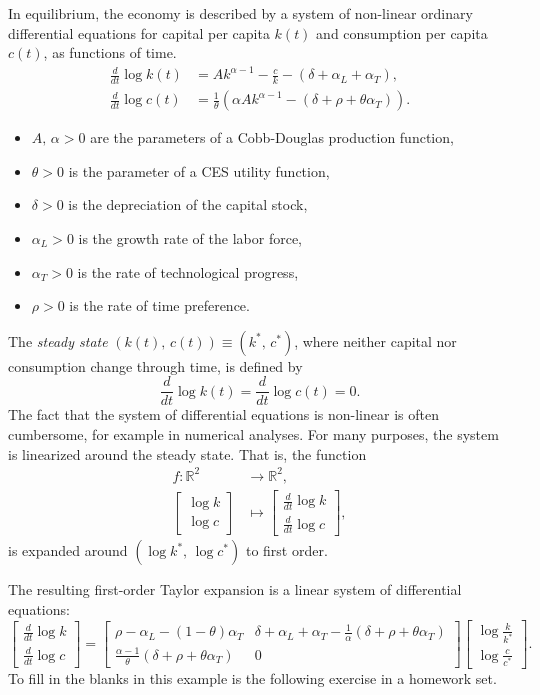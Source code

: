 \documentclass[graybox]{svmult}
\newcommand{\R}{\mathds{R}}
\begin{document}
In equilibrium, the economy is described by a system of non-linear ordinary differential equations for capital per capita $k(t)$ and consumption per capita $c(t)$, as functions of time.
\begin{align*}
\frac{d}{dt} \log k(t) &= A k^{\alpha-1} - \frac{c}{k} - (\delta + \alpha_L + \alpha_T),\\
\frac{d}{dt} \log c(t) &= \frac{1}{\theta} \left( \alpha A k^{\alpha-1} - (\delta + \rho + \theta \alpha_T) \right).
\end{align*}
\begin{itemize}
\item $A,\, \alpha>0$ are the parameters of a Cobb-Douglas production function, 
\item $\theta>0$ is the parameter of a CES utility function,
\item $\delta >0$ is the depreciation of the capital stock,
\item $\alpha_L>0$ is the growth rate of the labor force,
\item $\alpha_T>0$ is the rate of technological progress, 
\item $\rho>0$ is the rate of time preference.
\end{itemize}

The \textit{steady state} $(k(t),\, c(t)) \equiv (k^\ast,\, c^\ast)$, where neither capital nor consumption change through time, is defined by
\[
\frac{d}{dt} \log k(t) = \frac{d}{dt} \log c(t) = 0.
\]
The fact that the system of differential equations is non-linear is often cumbersome, for example in numerical analyses.  For many purposes, the system is linearized around the steady state.  That is, the function
\begin{align*}
f : \R^2 &\longrightarrow \R^2,\\
\left[ \begin{array}{c} \log k \\ \log c \end{array} \right] &\longmapsto \left[ \begin{array}{c} \frac{d}{dt} \log k \\ \frac{d}{dt} \log c \end{array} \right],
\end{align*}
is expanded around $(\log k^\ast,\, \log c^\ast)$ to first order. 

The resulting first-order Taylor expansion is a linear system of differential equations:
\[
\left[ \begin{array}{c} \frac{d}{dt} \log k \\ \frac{d}{dt} \log c \end{array} \right] = \left[ \begin{array}{cc} \rho-\alpha_L-(1-\theta)\alpha_T & \delta+\alpha_L+\alpha_T-\frac{1}{\alpha}(\delta+\rho+\theta\alpha_T) \\ \frac{\alpha-1}{\theta}(\delta+\rho+\theta\alpha_T) & 0 \end{array} \right] \left[ \begin{array}{c} \log \frac{k}{k^\ast} \\ \log \frac{c}{c^\ast} \end{array} \right].
\]
To fill in the blanks in this example is the following exercise in a homework set. 
\end{document}
